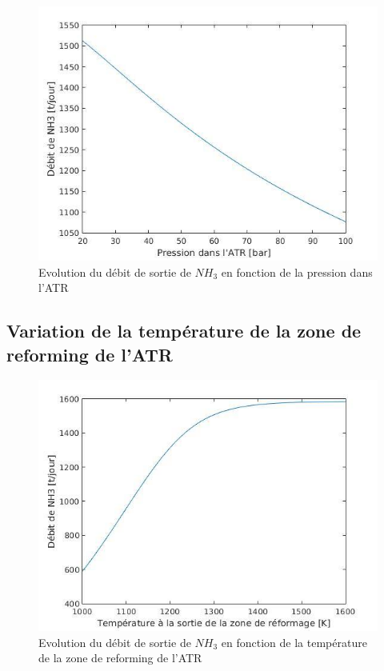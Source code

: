 \documentclass[12pt]{report}
\begin{document}
\begin{figure}[H]
\begin{center}
\includegraphics[scale=0.6]{debit_NH3_pression_ATR}
\caption{Evolution du débit de sortie de $NH_3$ en fonction de la pression dans l'ATR}
\end{center}
\end{figure}


\subsection{Variation de la température de la zone de reforming de l'ATR}

\begin{figure}[H]
\begin{center}
\includegraphics[scale=0.6]{debit_NH3_Temperature}
\caption{Evolution du débit de sortie de $NH_3$ en fonction de la température de la zone de reforming de l'ATR}
\end{center}
\end{figure}
\end{document}
